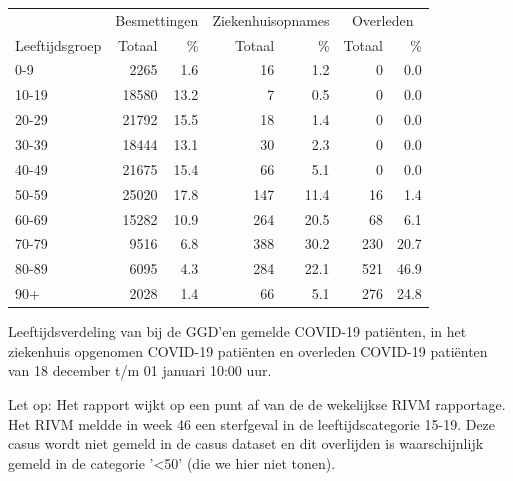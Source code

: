 \documentclass[
  english,
  man,floatsintext]{apa6}
\begin{document}
\begin{table}[H]
\centering\begingroup\fontsize{11}{13}\selectfont

\begin{threeparttable}
\begin{tabular}{lrrrrrr}
\toprule
\multicolumn{1}{c}{ } & \multicolumn{2}{c}{Besmettingen} & \multicolumn{2}{c}{Ziekenhuisopnames} & \multicolumn{2}{c}{Overleden} \\
\cmidrule(l{3pt}r{3pt}){2-3} \cmidrule(l{3pt}r{3pt}){4-5} \cmidrule(l{3pt}r{3pt}){6-7}
Leeftijdsgroep & Totaal & \% & Totaal & \% & Totaal & \%\\
\midrule
0-9 & 2265 & 1.6 & 16 & 1.2 & 0 & 0.0\\
10-19 & 18580 & 13.2 & 7 & 0.5 & 0 & 0.0\\
20-29 & 21792 & 15.5 & 18 & 1.4 & 0 & 0.0\\
30-39 & 18444 & 13.1 & 30 & 2.3 & 0 & 0.0\\
40-49 & 21675 & 15.4 & 66 & 5.1 & 0 & 0.0\\
50-59 & 25020 & 17.8 & 147 & 11.4 & 16 & 1.4\\
60-69 & 15282 & 10.9 & 264 & 20.5 & 68 & 6.1\\
70-79 & 9516 & 6.8 & 388 & 30.2 & 230 & 20.7\\
80-89 & 6095 & 4.3 & 284 & 22.1 & 521 & 46.9\\
90+ & 2028 & 1.4 & 66 & 5.1 & 276 & 24.8\\
\bottomrule
\end{tabular}
\begin{tablenotes}
\item[1] Leeftijdsverdeling van bij de GGD’en gemelde COVID-19 patiënten, in het ziekenhuis opgenomen COVID-19 patiënten en overleden COVID-19 patiënten van 18 december t/m 01 januari 10:00 uur.
\item[2] Let op: Het rapport wijkt op een punt af van de de wekelijkse RIVM rapportage. Het RIVM meldde in week 46 een sterfgeval in de leeftijdscategorie 15-19. Deze casus wordt niet gemeld in de casus dataset en dit overlijden is waarschijnlijk gemeld in de categorie '<50' (die we hier niet tonen).
\end{tablenotes}
\end{threeparttable}
\endgroup{}
\end{table}

\newpage
\end{document}
